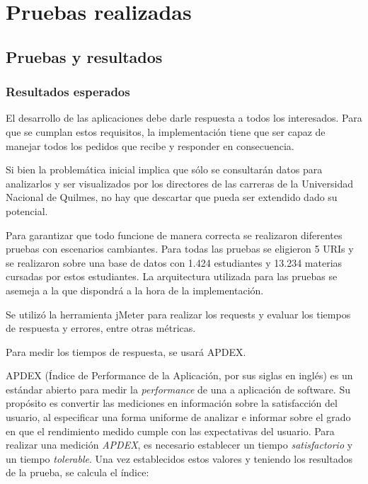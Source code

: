 \chapter{Pruebas realizadas}
\label{sec:implementacion}

\section[Pruebas y resultados]{Pruebas y resultados}

\subsection[Resultados esperados]{Resultados esperados}

El desarrollo de las aplicaciones debe darle respuesta a todos los interesados. Para que se cumplan estos requisitos, la implementación tiene que ser capaz de manejar todos los pedidos que recibe y responder en consecuencia. 

Si bien la problemática inicial implica que sólo se consultarán datos para analizarlos y ser visualizados por los directores de las carreras de la Universidad Nacional de Quilmes, no hay que descartar que pueda ser extendido dado su potencial.

Para garantizar que todo funcione de manera correcta se realizaron diferentes pruebas con escenarios cambiantes.
Para todas las pruebas se eligieron 5 URIs y se realizaron sobre una base de datos con 1.424 estudiantes y 13.234 materias cursadas por estos estudiantes.
La arquitectura utilizada para las pruebas se asemeja a la que dispondrá a la hora de la implementación.

Se utilizó la herramienta jMeter para realizar los requests y evaluar los tiempos de respuesta y errores, entre otras métricas.

Para medir los tiempos de respuesta, se usará APDEX.

APDEX (Índice de Performance de la Aplicación, por sus siglas en inglés) es un estándar abierto para medir la \textit{performance} de una a aplicación de software. Su propósito es convertir las mediciones en información sobre la satisfacción del usuario, al especificar una forma uniforme de analizar e informar sobre el grado en que el rendimiento medido cumple con las expectativas del usuario.
Para realizar una medición \textit{APDEX}, es necesario establecer un tiempo \emph{satisfactorio} y un tiempo \emph{tolerable}.
Una vez establecidos estos valores y teniendo los resultados de la prueba, se calcula el índice:

